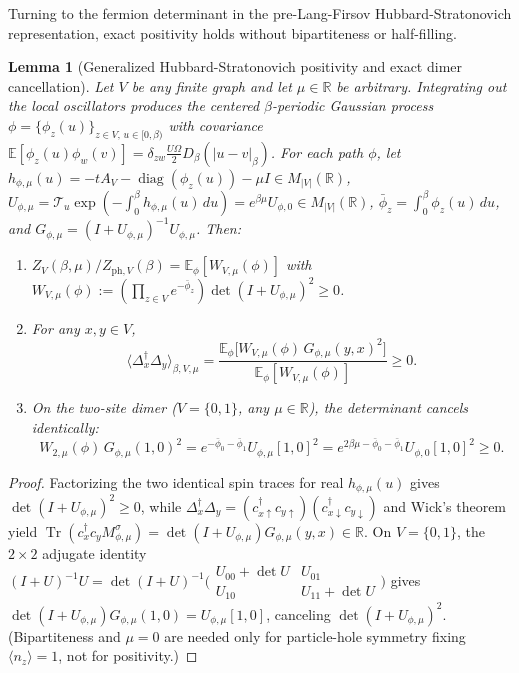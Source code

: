 \documentclass[11pt]{article}
\newtheorem{lemma}[theorem]{Lemma}
\theoremstyle{definition}
\theoremstyle{remark}
\DeclareMathOperator{\Tr}{Tr}
\DeclareMathOperator{\diag}{diag}
\newcommand{\E}{\mathbb{E}}
\newcommand{\R}{\mathbb{R}}
\newcommand{\Dop}{\Delta}
\begin{document}
Turning to the fermion determinant in the pre-Lang-Firsov Hubbard-Stratonovich
representation, exact positivity holds without bipartiteness or half-filling.

\begin{lemma}[Generalized Hubbard-Stratonovich positivity and exact dimer cancellation]
\label{lem:tel-hs}
Let $V$ be any finite graph and let $\mu \in \R$ be arbitrary. Integrating out
the local oscillators produces the centered $\beta$-periodic Gaussian process
$\phi = \{\phi_z(u)\}_{z \in V,\, u \in [0,\beta)}$ with covariance
$\E[\phi_z(u)\phi_w(v)] = \delta_{zw} \frac{U\Omega}{2} D_\beta(|u-v|_\beta)$.
For each path $\phi$, let $h_{\phi,\mu}(u) = -t A_V - \diag(\phi_z(u)) - \mu I \in M_{|V|}(\R)$,
$U_{\phi,\mu} = \mathcal{T}_u \exp(-\int_0^\beta h_{\phi,\mu}(u)\,du) = e^{\beta\mu} U_{\phi,0} \in M_{|V|}(\R)$,
$\bar\phi_z = \int_0^\beta \phi_z(u)\,du$, and $G_{\phi,\mu} = (I + U_{\phi,\mu})^{-1} U_{\phi,\mu}$.
Then:
\begin{enumerate}[leftmargin=1.5em]
\item $Z_V(\beta,\mu)/Z_{\mathrm{ph},V}(\beta) = \E_\phi[W_{V,\mu}(\phi)]$
with $W_{V,\mu}(\phi) := (\prod_{z \in V} e^{-\bar\phi_z})\det(I + U_{\phi,\mu})^2 \ge 0$.
\item For any $x, y \in V$,
\[
\langle \Dop_x^\dagger \Dop_y \rangle_{\beta,V,\mu}
= \frac{\E_\phi\bigl[W_{V,\mu}(\phi)\, G_{\phi,\mu}(y,x)^2\bigr]}{\E_\phi[W_{V,\mu}(\phi)]} \ge 0.
\]
\item On the two-site dimer ($V = \{0,1\}$, any $\mu \in \R$), the determinant
cancels identically:
\[
W_{2,\mu}(\phi)\, G_{\phi,\mu}(1,0)^2
= e^{-\bar\phi_0 - \bar\phi_1} U_{\phi,\mu}[1,0]^2
= e^{2\beta\mu - \bar\phi_0 - \bar\phi_1} U_{\phi,0}[1,0]^2 \ge 0.
\]
\end{enumerate}
\end{lemma}

\begin{proof}
Factorizing the two identical spin traces for real $h_{\phi,\mu}(u)$ gives
$\det(I + U_{\phi,\mu})^2 \ge 0$, while $\Dop_x^\dagger \Dop_y = (c_{x\uparrow}^\dagger c_{y\uparrow})(c_{x\downarrow}^\dagger c_{y\downarrow})$
and Wick's theorem yield $\Tr(c_x^\dagger c_y M_{\phi,\mu}^\sigma) = \det(I + U_{\phi,\mu}) G_{\phi,\mu}(y,x) \in \R$.
On $V = \{0,1\}$, the $2\times 2$ adjugate identity $(I + U)^{-1}U = \det(I + U)^{-1}\bigl(\begin{smallmatrix}U_{00}+\det U & U_{01}\\ U_{10} & U_{11}+\det U\end{smallmatrix}\bigr)$
gives $\det(I + U_{\phi,\mu}) G_{\phi,\mu}(1,0) = U_{\phi,\mu}[1,0]$, canceling
$\det(I + U_{\phi,\mu})^2$. (Bipartiteness and $\mu=0$ are needed only for
particle-hole symmetry fixing $\langle n_z\rangle = 1$, not for positivity.)
\end{proof}
\end{document}
